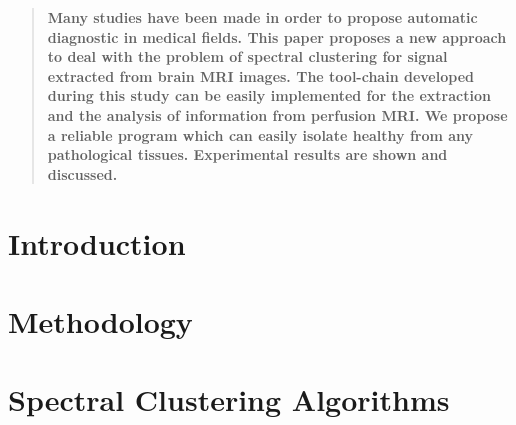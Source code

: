 \documentclass[twoside,twocolumn,a4paper,10pt]{article}
\begin{document}
  \setlength{\absparindent}{1cm}
  \setlength{\absparsep}{1cm}
  \setlength{\absleftindent}{0pt}
  \setlength{\absrightindent}{0pt}



\maketitle
    \begin{abstract}
      \textbf{Many studies have been made in order to propose automatic diagnostic in medical fields. This paper proposes a new approach to deal with the problem of spectral clustering for signal extracted from brain MRI images. The tool-chain developed during this study can be easily implemented for the extraction and the analysis of information from perfusion MRI. We propose a reliable program which can easily isolate healthy from any pathological tissues. Experimental results are shown and discussed.}
    \end{abstract}
    \textit{}
\medskip



\section{Introduction}




\section{Methodology}




\section{Spectral Clustering Algorithms}


\end{document}
